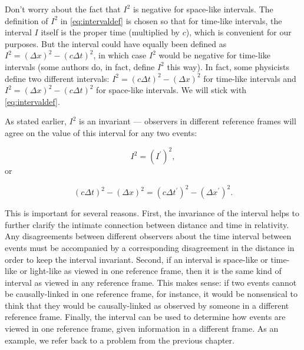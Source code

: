 Don't worry about the fact that $I^2$ is negative for space-like
intervals.  The definition of $I^2$ in \eqref{eq:intervaldef} is
chosen so that for time-like intervals, the interval $I$ itself is the
proper time (multiplied by $c$), which is convenient for our purposes.  
But the interval could have equally been defined as 
$I^2 = \left(\Delta x\right)^2 - \left(c \Delta t\right)^2$, 
in which case $I^2$ would be negative for
time-like intervals (some authors do, in fact, define $I^2$ this way).
In fact, some physicists define two different intervals: $I^2 =
\left(c\Delta t\right)^2-\left(\Delta x\right)^2$ for time-like
intervals and $I^2 = \left(\Delta x\right)^2-\left(c\Delta t\right)^2$
for space-like intervals.  We will stick with \eqref{eq:intervaldef}.

As stated earlier, $I^2$ is an invariant --- observers in different
reference frames will agree on the value of this interval for any two
events:
    
\begin{equation}
I^2 = \left(I^\prime\right)^2,
\end{equation}
or

\begin{lemma}
\begin{equation}
\left(c\Delta t\right)^2 - \left(\Delta x\right)^2 = 
              \left(c\Delta t^\prime\right)^2 - 
     \left(\Delta x^\prime\right)^2.
\label{eq:interval-invariance}
\end{equation}
\end{lemma}

 This is important for several reasons.  First, the
invariance of the interval helps to further clarify the intimate
connection between distance and time in relativity.  Any disagreements
between different observers about the time interval between events
must be accompanied by a corresponding disagreement in the distance in
order to keep the interval invariant.  Second, if an interval is
space-like or time-like or light-like as viewed in one reference
frame, then it is the same kind of interval as viewed in any reference
frame.  This makes sense: if two events cannot be causally-linked in
one reference frame, for instance, it would be nonsensical to think
that they would be causally-linked as observed by someone in a
different reference frame.  Finally, the interval can be used to
determine how events are viewed in one reference frame, given
information in a different frame.  As an example, we refer back to a
problem from the previous chapter.



